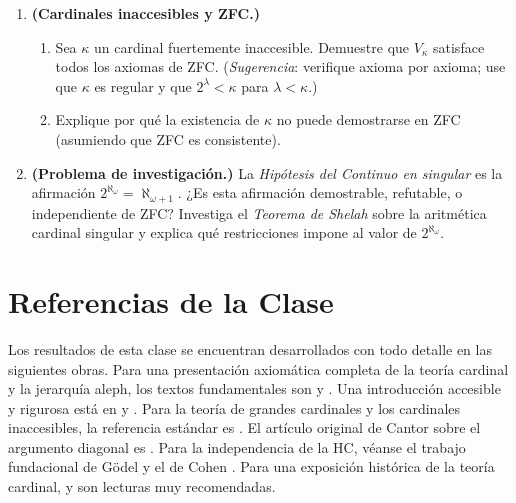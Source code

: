 \begin{enumerate}[leftmargin=2em, label=\textbf{\arabic*.}]
\item \textbf{(Cardinales inaccesibles y ZFC.)}
\begin{enumerate}[label=(\alph*)]
  \item Sea $\kappa$ un cardinal fuertemente inaccesible. Demuestre que $V_\kappa$ satisface todos los axiomas de ZFC. (\emph{Sugerencia}: verifique axioma por axioma; use que $\kappa$ es regular y que $2^\lambda < \kappa$ para $\lambda < \kappa$.)
  \item Explique por qué la existencia de $\kappa$ no puede demostrarse en ZFC (asumiendo que ZFC es consistente).
\end{enumerate}

\item \textbf{(Problema de investigación.)}
La \emph{Hipótesis del Continuo en singular} es la afirmación $2^{\aleph_\omega} = \aleph_{\omega+1}$. ¿Es esta afirmación demostrable, refutable, o independiente de ZFC? Investiga el \emph{Teorema de Shelah} sobre la aritmética cardinal singular y explica qué restricciones impone al valor de $2^{\aleph_\omega}$.

\end{enumerate}

\section{Referencias de la Clase}

Los resultados de esta clase se encuentran desarrollados con todo detalle en las siguientes obras. Para una presentación axiomática completa de la teoría cardinal y la jerarquía aleph, los textos fundamentales son \cite{jech2003} y \cite{kunen2011}. Una introducción accesible y rigurosa está en \cite{enderton1977} y \cite{hrbacek1999}. Para la teoría de grandes cardinales y los cardinales inaccesibles, la referencia estándar es \cite{kanamori2003}. El artículo original de Cantor sobre el argumento diagonal es \cite{cantor1891}. Para la independencia de la HC, véanse el trabajo fundacional de Gödel \cite{godel1940} y el de Cohen \cite{cohen1966}. Para una exposición histórica de la teoría cardinal, \cite{sierpinski1958} y \cite{halmos1960} son lecturas muy recomendadas.

\nocite{cantor1897, vonneumann1923, levy1979, devlin1993, suppes1972}
